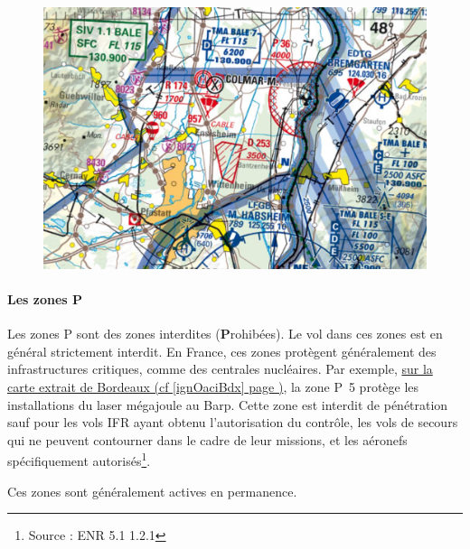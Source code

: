 	\begin{figure}[H]
	\centering
	\begin{minipage}[c]{0.5\linewidth}
	\includegraphics[width=\linewidth]{02-Navigation/img/IGN_OACI_D253.png}
	\end{minipage}
	\end{figure}
			
			\paragraph{Les zones P}
			Les zones P sont des zones interdites (\textbf{P}rohibées). Le vol dans ces zones est en général strictement interdit. En France, ces zones protègent généralement des infrastructures critiques, comme des centrales nucléaires. Par exemple, \hyperlink{ignOaciBordeaux.1}{sur la carte extrait de Bordeaux (cf \ref{ignOaciBdx} page \pageref{ignOaciBdx})}, la zone P~5 protège les installations du laser mégajoule au Barp. Cette zone est interdit de pénétration sauf pour les vols IFR ayant obtenu l'autorisation du contrôle, les vols de secours qui ne peuvent contourner dans le cadre de leur missions, et les aéronefs spécifiquement autorisés\footnote{Source : ENR 5.1 1.2.1}.
			
			Ces zones sont généralement actives en permanence.
			
